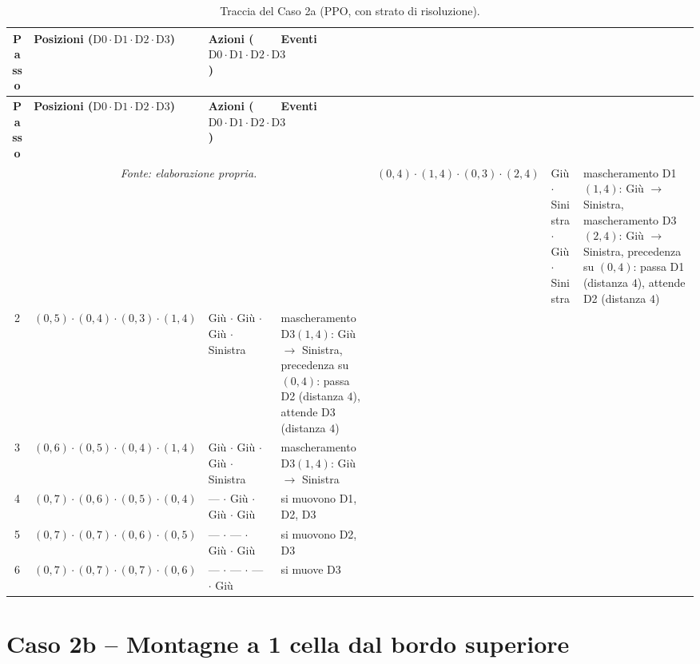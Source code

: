 \documentclass[12pt,a4paper,twoside]{report}
\begin{document}
{\footnotesize
\setlength{\tabcolsep}{3.5pt}
\begin{longtable}{c l l >{\raggedright\arraybackslash}p{3.8cm}}
\caption{Traccia del Caso 2a (PPO, con strato di risoluzione).}\\
\toprule
\textbf{Passo} & \textbf{Posizioni ($\text{D0} \cdot \text{D1} \cdot \text{D2} \cdot \text{D3}$)} & \textbf{Azioni ($\text{D0} \cdot \text{D1} \cdot \text{D2} \cdot \text{D3}$)} & \textbf{Eventi} \\
\midrule
\endfirsthead
\toprule
\textbf{Passo} & \textbf{Posizioni ($\text{D0} \cdot \text{D1} \cdot \text{D2} \cdot \text{D3}$)} & \textbf{Azioni ($\text{D0} \cdot \text{D1} \cdot \text{D2} \cdot \text{D3}$)} & \textbf{Eventi} \\
\midrule
\endhead
\bottomrule
\multicolumn{4}{c}{\footnotesize\emph{Fonte: elaborazione propria.}}
\endlastfoot
1 & $(0, 4) \cdot (1, 4) \cdot (0, 3) \cdot (2, 4)$ & Giù $\cdot$ Sinistra $\cdot$ Giù $\cdot$ Sinistra & mascheramento D1$(1, 4)$: Giù $\to$ Sinistra, mascheramento D3$(2, 4)$: Giù $\to$ Sinistra, precedenza su $(0, 4)$: passa D1 (distanza $4$), attende D2 (distanza $4$) \\
2 & $(0, 5) \cdot (0, 4) \cdot (0, 3) \cdot (1, 4)$ & Giù $\cdot$ Giù $\cdot$ Giù $\cdot$ Sinistra      & mascheramento D3$(1, 4)$: Giù $\to$ Sinistra, precedenza su $(0, 4)$: passa D2 (distanza $4$), attende D3 (distanza $4$) \\
3 & $(0, 6) \cdot (0, 5) \cdot (0, 4) \cdot (1, 4)$ & Giù $\cdot$ Giù $\cdot$ Giù $\cdot$ Sinistra      & mascheramento D3$(1, 4)$: Giù $\to$ Sinistra \\
4 & $(0, 7) \cdot (0, 6) \cdot (0, 5) \cdot (0, 4)$ & --- $\cdot$ Giù $\cdot$ Giù $\cdot$ Giù           & si muovono D1, D2, D3 \\
5 & $(0, 7) \cdot (0, 7) \cdot (0, 6) \cdot (0, 5)$ & --- $\cdot$ --- $\cdot$ Giù $\cdot$ Giù           & si muovono D2, D3 \\*
6 & $(0, 7) \cdot (0, 7) \cdot (0, 7) \cdot (0, 6)$ & --- $\cdot$ --- $\cdot$ --- $\cdot$ Giù           & si muove D3 \\*
\end{longtable}
}

\newpage
\section{Caso 2b -- Montagne a 1 cella dal bordo superiore}
\label{sec:app_caso_2b}
\end{document}
